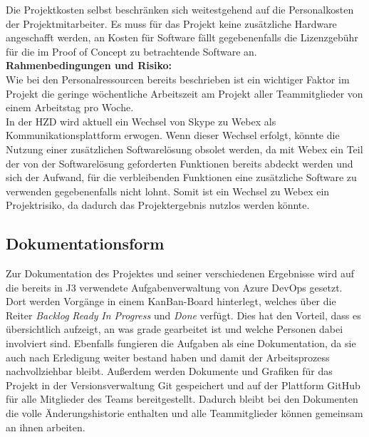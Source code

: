 \documentclass[ThesisDJ.tex]{subfiles}
\begin{document}
	Die Projektkosten selbst beschränken sich weitestgehend auf die Personalkosten der Projektmitarbeiter.
	Es muss für das Projekt keine zusätzliche Hardware angeschafft werden, an Kosten für Software fällt gegebenenfalls die Lizenzgebühr für die im Proof of Concept zu betrachtende Software an.\bigskip\\
	\textbf{Rahmenbedingungen und Risiko:}\medskip\\
	Wie bei den Personalressourcen bereits beschrieben ist ein wichtiger Faktor im Projekt die geringe wöchentliche Arbeitszeit am Projekt aller Teammitglieder von einem Arbeitstag pro Woche.\\	
	In der HZD wird aktuell ein Wechsel von Skype zu Webex als Kommunikationsplattform erwogen. Wenn dieser Wechsel erfolgt, könnte die Nutzung einer zusätzlichen Softwarelösung obsolet werden, da mit Webex ein Teil der von der Softwarelösung geforderten Funktionen bereits abdeckt werden und sich der Aufwand, für die verbleibenden Funktionen eine zusätzliche Software zu verwenden gegebenenfalls nicht lohnt. Somit ist ein Wechsel zu Webex ein Projektrisiko, da dadurch das Projektergebnis nutzlos werden könnte. 

	
	\subsection{Dokumentationsform}
  Zur Dokumentation des Projektes und seiner verschiedenen Ergebnisse wird auf die bereits in J3 verwendete Aufgabenverwaltung von Azure DevOps gesetzt.
  Dort werden Vorgänge in einem KanBan-Board hinterlegt, welches über die Reiter \emph{Backlog} \emph{Ready} \emph{In Progress} und \emph{Done} verfügt.
  Dies hat den Vorteil, dass es übersichtlich aufzeigt, an was grade gearbeitet ist und welche Personen dabei involviert sind. Ebenfalls fungieren die 
  Aufgaben als eine Dokumentation, da sie auch nach Erledigung weiter bestand haben und damit der Arbeitsprozess nachvollziehbar bleibt. Außerdem werden 
  Dokumente und Grafiken für das Projekt in der Versionsverwaltung Git gespeichert und auf der Plattform GitHub für alle Mitglieder des Teams bereitgestellt. Dadurch bleibt 
  bei den Dokumenten die volle Änderungshistorie enthalten und alle Teammitglieder können gemeinsam an ihnen arbeiten.
	
\end{document}
